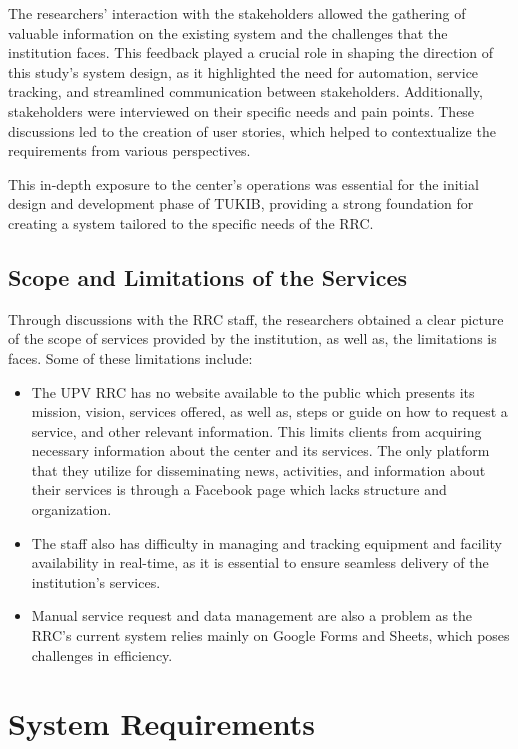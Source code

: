 The researchers' interaction with the stakeholders allowed the gathering of valuable information on the existing system and the challenges that the institution faces. This feedback played a crucial role in shaping the direction of this study's system design, as it highlighted the need for automation, service tracking, and streamlined communication between stakeholders. Additionally, stakeholders were interviewed on their specific needs and pain points. These discussions led to the creation of user stories, which helped to contextualize the requirements from various perspectives. 

This in-depth exposure to the center’s operations was essential for the initial design and development phase of TUKIB, providing a strong foundation for creating a system tailored to the specific needs of the RRC.

\subsection{Scope and Limitations of the Services}
Through discussions with the RRC staff, the researchers obtained a clear picture of the scope of services provided by the institution, as well as, the limitations is faces. Some of these limitations include:

\begin{itemize}
	\item The UPV RRC has no website available to the public which presents its mission, vision, services offered, as well as, steps or guide on how to request a service, and other relevant information. This limits clients from acquiring necessary information about the center and its services. The only platform that they utilize for disseminating news, activities, and information about their services is through a Facebook page which lacks structure and organization.
	\item The staff also has difficulty in managing and tracking equipment and facility availability in real-time, as it is essential to ensure seamless delivery of the institution's services.
	\item Manual service request and data management are also a problem as the RRC’s current system relies mainly on Google Forms and Sheets, which poses challenges in efficiency.
\end{itemize}

\section{System Requirements}

